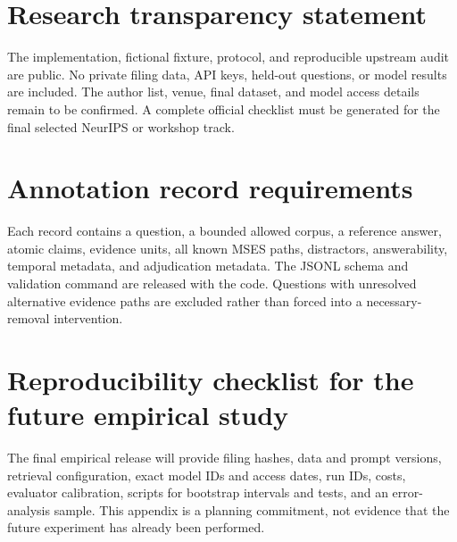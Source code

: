 \documentclass{article}
\newcommand{\mses}{\textsc{MSES}}
\begin{document}
\section*{Research transparency statement}

The implementation, fictional fixture, protocol, and reproducible upstream
audit are public. No private filing data, API keys, held-out questions, or
model results are included. The author list, venue, final dataset, and model
access details remain to be confirmed. A complete official checklist must be
generated for the final selected NeurIPS or workshop track.

{\small


}

\appendix
\section{Annotation record requirements}

Each record contains a question, a bounded allowed corpus, a reference answer,
atomic claims, evidence units, all known \mses{} paths, distractors,
answerability, temporal metadata, and adjudication metadata. The JSONL schema
and validation command are released with the code. Questions with unresolved
alternative evidence paths are excluded rather than forced into a
necessary-removal intervention.

\section{Reproducibility checklist for the future empirical study}

The final empirical release will provide filing hashes, data and prompt
versions, retrieval configuration, exact model IDs and access dates, run IDs,
costs, evaluator calibration, scripts for bootstrap intervals and tests, and
an error-analysis sample. This appendix is a planning commitment, not evidence
that the future experiment has already been performed.
\end{document}
